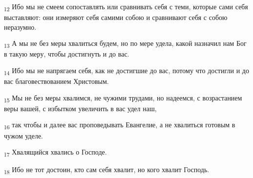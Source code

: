 \begin{tcolorbox}
\textsubscript{12} Ибо мы не смеем сопоставлять или сравнивать себя с теми, которые сами себя выставляют: они измеряют себя самими собою и сравнивают себя с собою неразумно.
\end{tcolorbox}
\begin{tcolorbox}
\textsubscript{13} А мы не без меры хвалиться будем, но по мере удела, какой назначил нам Бог в такую меру, чтобы достигнуть и до вас.
\end{tcolorbox}
\begin{tcolorbox}
\textsubscript{14} Ибо мы не напрягаем себя, как не достигшие до вас, потому что достигли и до вас благовествованием Христовым.
\end{tcolorbox}
\begin{tcolorbox}
\textsubscript{15} Мы не без меры хвалимся, не чужими трудами, но надеемся, с возрастанием веры вашей, с избытком увеличить в вас удел наш,
\end{tcolorbox}
\begin{tcolorbox}
\textsubscript{16} так чтобы и далее вас проповедывать Евангелие, а не хвалиться готовым в чужом уделе.
\end{tcolorbox}
\begin{tcolorbox}
\textsubscript{17} Хвалящийся хвались о Господе.
\end{tcolorbox}
\begin{tcolorbox}
\textsubscript{18} Ибо не тот достоин, кто сам себя хвалит, но кого хвалит Господь.
\end{tcolorbox}
